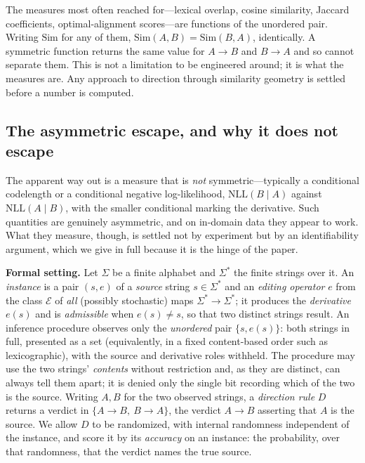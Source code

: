 \documentclass[11pt,letterpaper]{article}
\newcommand{\nll}{\mathrm{NLL}}
\begin{document}
The measures most often reached for---lexical overlap, cosine similarity, Jaccard coefficients, optimal-alignment scores---are functions of the unordered pair. Writing $\mathrm{Sim}$ for any of them, $\mathrm{Sim}(A,B)=\mathrm{Sim}(B,A)$, identically. A symmetric function returns the same value for $A\!\to\!B$ and $B\!\to\!A$ and so cannot separate them. This is not a limitation to be engineered around; it is what the measures are. Any approach to direction through similarity geometry is settled before a number is computed.

\subsection{The asymmetric escape, and why it does not escape}

The apparent way out is a measure that is \emph{not} symmetric---typically a conditional codelength or a conditional negative log-likelihood, $\nll(B\mid A)$ against $\nll(A\mid B)$, with the smaller conditional marking the derivative. Such quantities are genuinely asymmetric, and on in-domain data they appear to work. What they measure, though, is settled not by experiment but by an identifiability argument, which we give in full because it is the hinge of the paper.

\textbf{Formal setting.} Let $\Sigma$ be a finite alphabet and $\Sigma^\ast$ the finite strings over it. An \emph{instance} is a pair $(s,e)$ of a \emph{source} string $s\in\Sigma^\ast$ and an \emph{editing operator} $e$ from the class $\mathcal{E}$ of \emph{all} (possibly stochastic) maps $\Sigma^\ast\!\to\!\Sigma^\ast$; it produces the \emph{derivative} $e(s)$ and is \emph{admissible} when $e(s)\neq s$, so that two distinct strings result. An inference procedure observes only the \emph{unordered} pair $\{s,e(s)\}$: both strings in full, presented as a set (equivalently, in a fixed content-based order such as lexicographic), with the source and derivative roles withheld. The procedure may use the two strings' \emph{contents} without restriction and, as they are distinct, can always tell them apart; it is denied only the single bit recording which of the two is the source. Writing $A,B$ for the two observed strings, a \emph{direction rule} $D$ returns a verdict in $\{A\!\to\!B,\ B\!\to\!A\}$, the verdict $A\!\to\!B$ asserting that $A$ is the source. We allow $D$ to be randomized, with internal randomness independent of the instance, and score it by its \emph{accuracy} on an instance: the probability, over that randomness, that the verdict names the true source.
\end{document}
